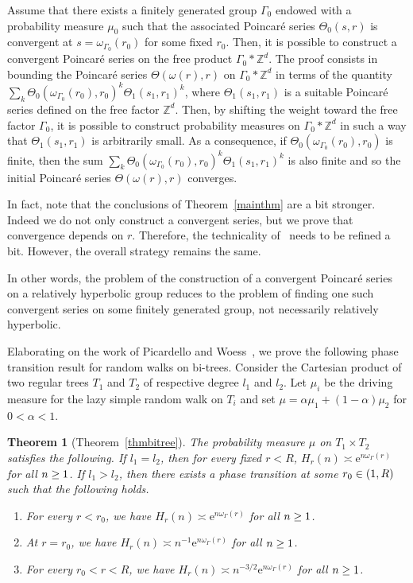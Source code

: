 \documentclass[10pt]{amsart}
\newtheorem{theo}{Theorem}[section]
\theoremstyle{definition}\newtheorem{defi}[theo]{Definition}\newtheorem{rema}[theo]{Remark}\newtheorem{exam}[theo]{Example}\newtheorem{exem}[theo]{Example}\newtheorem{nota}[theo]{Notation}
\newcommand{\Z}{\mathbb{Z}}
\newcommand{\rme}{\mathrm{e}}
\let\oldin\in
\renewcommand{\in}{\mathchoice{\oldin}{\oldin}{\,\oldin\,}{\,\oldin\,}}
\let\oldge\ge
\renewcommand{\ge}{\mathchoice{\oldge}{\oldge}{\,\oldge\,}{\,\oldge\,}}
\begin{document}
Assume that there exists a finitely generated group $\Gamma_0$ endowed with a probability measure $\mu_0$ such that the associated Poincaré series $\Theta_0(s,r)$ is convergent at $s=\omega_{{\Gamma_0}}(r_0)$ for some fixed $r_0$. Then, it is possible to construct a convergent Poincaré series on the free product $\Gamma_0*\Z^d$. The proof consists in bounding the Poincaré series $\Theta(\omega(r),r)$ on $\Gamma_0*\Z^d$ in terms of the quantity $\sum_{k}\Theta_0(\omega_{{\Gamma_0}}(r_0),r_0)^k\Theta_1(s_1,r_1)^k$, where $\Theta_1(s_1,r_1)$ is a suitable Poincaré series defined on the free factor $\Z^d$. Then, by shifting the weight toward the free factor $\Gamma_0$, it is possible to construct probability measures on $\Gamma_0*\Z^d$ in such a way that $\Theta_1(s_1,r_1)$ is arbitrarily small. As a consequence, if $\Theta_0(\omega_{{\Gamma_0}}(r_0),r_0)$ is finite, then the sum $\sum_{k}\Theta_0(\omega_{{\Gamma_0}}(r_0),r_0)^k\Theta_1(s_1,r_1)^k$ is also finite and so the initial Poincaré series $\Theta(\omega(r),r)$ converges.

In fact, note that the conclusions of Theorem~\ref{mainthm} are a bit stronger. Indeed we do not only construct a convergent series, but we prove that convergence depends on $r$. Therefore, the technicality of~\cite[Example~C]{DWY} needs to be refined a bit. However, the overall strategy remains the same.

In other words, the problem of the construction of a convergent Poincaré series on a relatively hyperbolic group reduces to the problem of finding one such convergent series on some finitely generated group, not necessarily relatively hyperbolic.


Elaborating on the work of Picardello and Woess~\cite{PicardelloWoessbitree}, we prove the following phase transition result for random walks on bi-trees. Consider the Cartesian product of two regular trees $T_1$ and $T_2$ of respective degree $l_1$ and $l_2$. Let $\mu_i$ be {the driving measure for the lazy simple random walk} on $T_i$ and set $\mu=\alpha \mu_1 +(1-\alpha)\mu_2$ for $0<\alpha<1$.

\begin{theo}[{Theorem~\ref{thmbitree}}]\label{mainthmbitree}
The probability measure $\mu$ on $T_1\times T_2$ satisfies the following. If $l_1=l_2$, then for every fixed $r<R$, $H_r(n)\asymp \rme^{n\omega_\Gamma(r)}$ for all $n\ge 1$. If $l_1>l_2$, then there exists a phase transition at some $r_0\in (1,R)$ such that the following holds.
\begin{enumerate}
\item\label{theo1.6.1} For every $r<r_0$, we have $H_r(n)\asymp \rme^{n\omega_\Gamma(r)}$ for all $n\ge 1$.
\item\label{theo1.6.2} At $r=r_0$, we have $H_r(n)\asymp n^{-1}\rme^{n\omega_\Gamma(r)}$ for all $n\ge 1$.
\item\label{theo1.6.3} For every $r_0<r<R$, we have $H_r(n)\asymp n^{-3/2}\rme^{n\omega_\Gamma(r)}$ for all $n\ge 1$.
\end{enumerate}
\end{theo}
\end{document}
